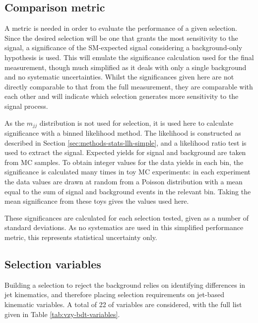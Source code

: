 \subsection{Comparison metric}
\label{sec:vzy-bdt-significance}

A metric is needed in order to evaluate the performance of a given selection.
Since the desired selection will be one that grants the most sensitivity to the
\VZy signal, a significance of the \ac{SM}-expected signal considering a background-only
hypothesis is used. This will emulate the significance calculation used for the
final measurement, though much simplified as it deals with only a single
background and no systematic uncertainties. Whilst the significances given here
are not directly comparable to that from the full measurement, they are comparable with
each other and will indicate which selection generates more sensitivity to the
signal process.

As the $m_{jj}$ distribution is not used for selection, it is used here to
calculate significance with a binned likelihood method.
The likelihood is
constructed as described in Section \ref{sec:methods-stats-llh-simple}, and a
likelihood ratio test is used to extract the signal. Expected yields for signal
and background are taken from \ac{MC} samples.
To obtain integer values for the data yields in each bin, the significance is
calculated many times in toy \ac{MC} experiments: in each experiment the data
values are drawn at random from a Poisson distribution with a mean equal to the
sum of signal and background events in the relevant bin. Taking the mean
significance from these toys gives the values used here.

These significances are calculated for each selection tested, given as a number
of standard deviations. As no systematics are used in this simplified
performance metric, this represents statistical uncertainty only.

\subsection{Selection variables}

Building a selection to reject the \QCDZy background relies on identifying
differences in jet kinematics, and therefore placing selection requirements on
jet-based kinematic variables. A total of 22 of variables are considered, with
the full list given in Table \ref{tab:vzy-bdt-variables}.

